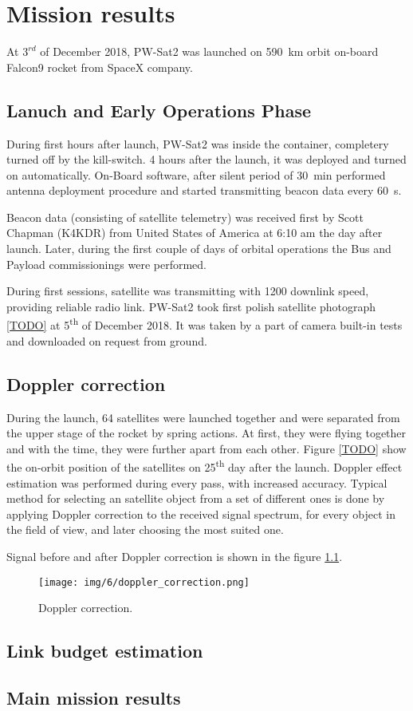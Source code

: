 \chapter{Mission results}
At $3^{rd}$ of December 2018, PW-Sat2 was launched on \SI{590}{\kilo\meter} orbit on-board Falcon9 rocket from SpaceX company. 

\section{Lanuch and Early Operations Phase}
During first hours after launch, PW-Sat2 was inside the container, completery turned off by the kill-switch. 4 hours after the launch, it was deployed and turned on automatically. On-Board software, after silent period of \SI{30}{\minute} performed antenna deployment procedure and started transmitting beacon data every \SI{60}{\second}.

Beacon data (consisting of satellite telemetry) was received first by Scott Chapman (K4KDR) from United States of America at 6:10 am the day after launch. Later, during the first couple of days of orbital operations the Bus and Payload commissionings were performed.

During first sessions, satellite was transmitting with \SI{1200}{\bps} downlink speed, providing reliable radio link. PW-Sat2 took first polish satellite photograph \ref{TODO} at \si{5^{th}} of December 2018. It was taken by a part of camera built-in tests and downloaded on request from ground.


\section{Doppler correction}
During the launch, \si{64} satellites were launched together and were separated from the upper stage of the rocket by spring actions. At first, they were flying together and with the time, they were further apart from each other. Figure \ref{TODO} show the on-orbit position of the satellites on \si{25^{th}} day after the launch. Doppler effect estimation was performed during every pass, with increased accuracy. Typical method for selecting an satellite object from a set of different ones is done by applying Doppler correction to the received signal spectrum, for every object in the field of view, and later choosing the most suited one. 

Signal before and after Doppler correction is shown in the figure \ref{Doppler_correction_gqrx}.

\begin{figure}[H]
    \centering
    \texttt{[image: img/6/doppler\_correction.png]}
    \caption{Doppler correction.}
    \label{Doppler_correction_gqrx}
\end{figure}

\section{Link budget estimation}


\section{Main mission results}


